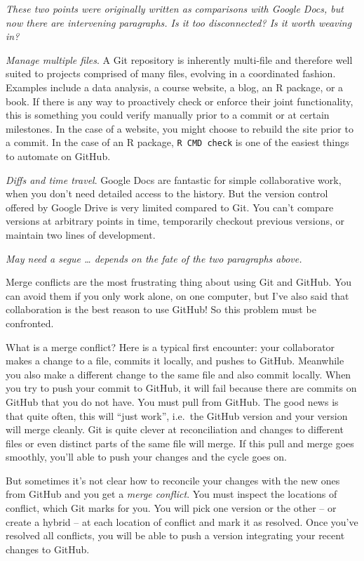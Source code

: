 \documentclass[12pt]{article}
\begin{document}
\emph{These two points were originally written as comparisons with
Google Docs, but now there are intervening paragraphs. Is it too
disconnected? Is it worth weaving in?}

\emph{Manage multiple files}. A Git repository is inherently multi-file
and therefore well suited to projects comprised of many files, evolving
in a coordinated fashion. Examples include a data analysis, a course
website, a blog, an R package, or a book. If there is any way to
proactively check or enforce their joint functionality, this is
something you could verify manually prior to a commit or at certain
milestones. In the case of a website, you might choose to rebuild the
site prior to a commit. In the case of an R package,
\texttt{R\ CMD\ check} is one of the easiest things to automate on
GitHub.

\emph{Diffs and time travel}. Google Docs are fantastic for simple
collaborative work, when you don't need detailed access to the history.
But the version control offered by Google Drive is very limited compared
to Git. You can't compare versions at arbitrary points in time,
temporarily checkout previous versions, or maintain two lines of
development.

\emph{May need a segue \ldots{} depends on the fate of the two
paragraphs above.}

Merge conflicts are the most frustrating thing about using Git and
GitHub. You can avoid them if you only work alone, on one computer, but
I've also said that collaboration is the best reason to use GitHub! So
this problem must be confronted.

What is a merge conflict? Here is a typical first encounter: your
collaborator makes a change to a file, commits it locally, and pushes to
GitHub. Meanwhile you also make a different change to the same file and
also commit locally. When you try to push your commit to GitHub, it will
fail because there are commits on GitHub that you do not have. You must
pull from GitHub. The good news is that quite often, this will ``just
work'', i.e.~the GitHub version and your version will merge cleanly. Git
is quite clever at reconciliation and changes to different files or even
distinct parts of the same file will merge. If this pull and merge goes
smoothly, you'll able to push your changes and the cycle goes on.

But sometimes it's not clear how to reconcile your changes with the new
ones from GitHub and you get a \emph{merge conflict}. You must inspect
the locations of conflict, which Git marks for you. You will pick one
version or the other -- or create a hybrid -- at each location of
conflict and mark it as resolved. Once you've resolved all conflicts,
you will be able to push a version integrating your recent changes to
GitHub.
\end{document}
